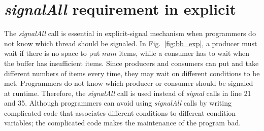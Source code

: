 \documentclass[preprint]{sigplanconf}
\begin{document}

\section{{\em signalAll} requirement in explicit} 
\label{sec:sigAll}
The {\em signalAll} call is essential in explicit-signal mechanism when programmers
do not know which thread should be signaled. In Fig.~\ref{fig:bb_exp}, a 
producer must wait if there is no space to put $num$ items, while a consumer 
has to wait when the buffer has insufficient items.
Since producers and consumers can put and take different numbers of items
every time, they may wait on different conditions to be met. Programmers 
do not know which producer or consumer should be signaled at runtime. 
Therefore, the {\em signalAll} call is used instead of {\em signal} calls in
line 21 and 35.
Although programmers can avoid using {\em signalAll} calls by writing
complicated code that associates different conditions to different condition 
variables; the complicated code makes the maintenance of the program
bad. 

\end{document}
